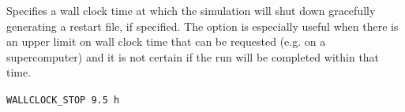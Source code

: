  Specifies a wall clock time at which the simulation will shut down gracefully generating a restart file, if specified. The option is especially useful when there is an upper limit on wall clock time that can be requested (e.g. on a supercomputer) and it is not certain if the run will be completed within that time.

\begin{mdframed}


\footnotesize
{\tt WALLCLOCK\_STOP 9.5 h}
\normalsize

\end{mdframed}


\hyperlink{target_key}{\return}

